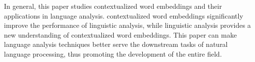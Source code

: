 \begin{eabstract}
In general, this paper studies contextualized word embeddings and their applications in language analysis.
contextualized word embeddings significantly improve the performance of linguistic analysis, while linguistic analysis provides a new understanding of contextualized word embeddings.
This paper can make language analysis techniques better serve the downstream tasks of natural language processing, thus promoting the development of the entire field.

%
%
\end{eabstract}

